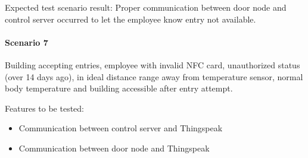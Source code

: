 \noindent
Expected test scenario result: Proper communication between door node and
control server occurred to let the employee know entry not available.

\paragraph{Scenario 7}
Building accepting entries, employee with invalid NFC card, unauthorized status 
(over 14 days ago), in ideal distance range away from temperature sensor, normal
body temperature and building accessible after entry attempt.

\noindent
Features to be tested:
\begin{itemize}
    \item Communication between control server and Thingspeak
    \item Communication between door node and Thingspeak
\end{itemize}

